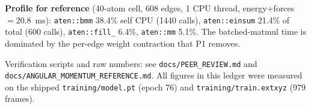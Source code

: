 \documentclass[10pt,a4paper]{article}
\newcommand{\code}[1]{\texttt{\small #1}}
\begin{document}
\footnotesize
\textbf{Profile for reference} (40-atom cell, 608 edges, 1 CPU thread, energy+forces
$=20.8$~ms): \code{aten::bmm} 38.4\% self CPU (1440 calls), \code{aten::einsum} 21.4\%
of total (600 calls), \code{aten::fill\_} 6.4\%, \code{aten::mm} 5.1\%. The batched-matmul
time is dominated by the per-edge weight contraction that P1 removes.

\vfill
\begin{center}\footnotesize\color{black!60}
Verification scripts and raw numbers: see \code{docs/PEER\_REVIEW.md} and
\code{docs/ANGULAR\_MOMENTUM\_REFERENCE.md}.
All figures in this ledger were measured on the shipped \code{training/model.pt}
(epoch 76) and \code{training/train.extxyz} (979 frames).
\end{center}
\end{document}
